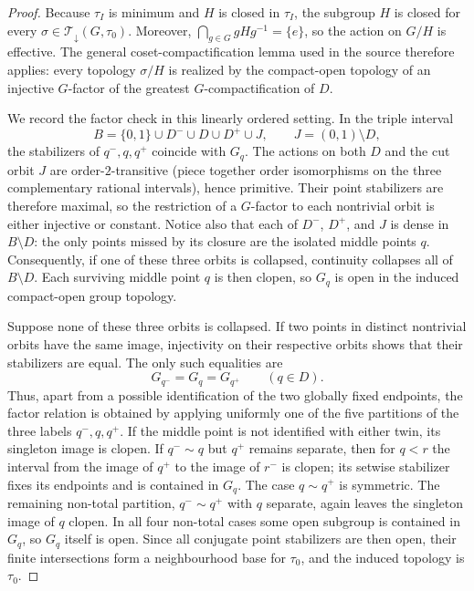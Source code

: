 \documentclass[11pt]{article}
\newcommand{\Tdown}{\mathcal T_{\downarrow}}
\begin{document}
\begin{proof}
Because $\tau_I$ is minimum and $H$ is closed in $\tau_I$, the subgroup
$H$ is closed for every $\sigma\in\Tdown(G,\tau_0)$.  Moreover,
$\bigcap_{g\in G}gHg^{-1}=\{e\}$, so the action on $G/H$ is effective.  The general
coset-compactification lemma used in the source therefore applies: every
topology $\sigma/H$ is realized by the compact-open topology of an injective
$G$-factor of the greatest $G$-compactification of $D$.

We record the factor check in this linearly ordered setting.  In the
triple interval
\[
 B=\{0,1\}\cup D^-\cup D\cup D^+\cup J,
 \qquad J=(0,1)\setminus D,
\]
the stabilizers of $q^-,q,q^+$ coincide with $G_q$.  The actions on both
$D$ and the cut orbit $J$ are order-$2$-transitive (piece together order
isomorphisms on the three complementary rational intervals), hence primitive.
Their point stabilizers are therefore maximal, so the restriction of a $G$-factor
to each nontrivial orbit is either injective or constant.  Notice also that
each of $D^-$, $D^+$, and $J$ is dense in $B\setminus D$: the only points
missed by its closure are the isolated middle points $q$.  Consequently, if
one of these three orbits is collapsed, continuity collapses all of
$B\setminus D$.  Each surviving middle point $q$ is then clopen, so $G_q$ is
open in the induced compact-open group topology.

Suppose none of these three orbits is collapsed.  If two points in distinct
nontrivial orbits have the same image, injectivity on their respective orbits
shows that their stabilizers are equal.  The only such equalities are
\[
 G_{q^-}=G_q=G_{q^+}\qquad(q\in D).
\]
Thus, apart from a possible identification of the two globally fixed
endpoints, the factor relation is obtained by applying uniformly one of the
five partitions of the three labels $q^-,q,q^+$.  If the middle point is not
identified with either twin, its singleton image is clopen.  If
$q^-\sim q$ but $q^+$ remains separate, then for $q<r$ the interval from the
image of $q^+$ to the image of $r^-$ is clopen; its setwise stabilizer fixes
its endpoints and is contained in $G_q$.  The case $q\sim q^+$ is symmetric.
The remaining non-total partition, $q^-\sim q^+$ with $q$ separate, again
leaves the singleton image of $q$ clopen.  In all four non-total cases some
open subgroup is contained in $G_q$, so $G_q$ itself is open.  Since all
conjugate point stabilizers are then open, their finite intersections form a
neighbourhood base for $\tau_0$, and the induced topology is $\tau_0$.


\end{proof}
\end{document}

